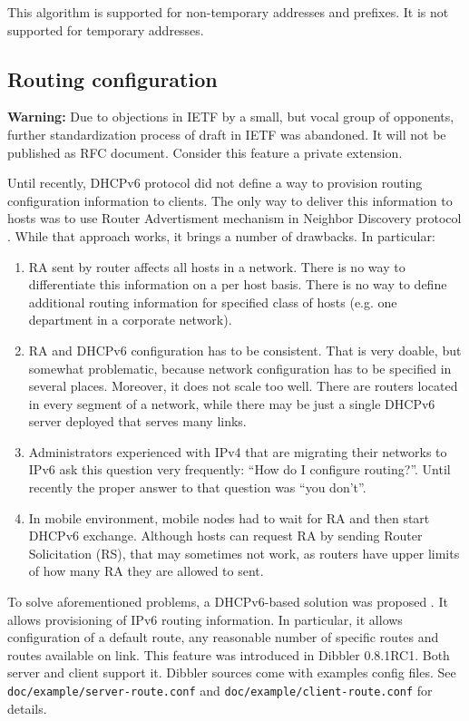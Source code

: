 This algorithm is supported for non-temporary addresses and
prefixes. It is not supported for temporary addresses.

\subsection{Routing configuration}
\label{feature-routing}

\textbf{Warning:} Due to objections in IETF by a small, but vocal group
of opponents, further standardization process
of \cite{draft-route-option} draft in IETF was abandoned. It will not
be published as RFC document. Consider this feature a private extension.

Until recently, DHCPv6 protocol did not define a way to provision
routing configuration information to clients. The only way to deliver
this information to hosts was to use Router Advertisment mechanism in
Neighbor Discovery protocol \cite{rfc4862}. While that approach works,
it brings a number of drawbacks. In particular:
\begin{enumerate}
\item RA sent by router affects all hosts in a network. There is no
way to differentiate this information on a per host basis. There is no
way to define additional routing information for specified class of
hosts (e.g. one department in a corporate network).
\item RA and DHCPv6 configuration has to be consistent. That is very
doable, but somewhat problematic, because network configuration has to
be specified in several places. Moreover, it does not scale too
well. There are routers located in every segment of a network, while
there may be just a single DHCPv6 server deployed that serves many links.
\item Administrators experienced with IPv4 that are migrating their
networks to IPv6 ask this question very frequently: ``How do I
configure routing?''. Until recently the proper answer to that
question was ``you don't''.
\item In mobile environment, mobile nodes had to wait for RA and then
start DHCPv6 exchange. Although hosts can request RA by sending Router
Solicitation (RS), that may sometimes not work, as routers have upper
limits of how many RA they are allowed to sent.
\end{enumerate}

To solve aforementioned problems, a DHCPv6-based solution was
proposed \cite{draft-route-option}. It allows provisioning of IPv6
routing information. In particular, it allows configuration of a
default route, any reasonable number of specific routes and routes
available on link. This feature was introduced in Dibbler
0.8.1RC1. Both server and client support it. Dibbler sources come with
examples config files. See \verb+doc/example/server-route.conf+
and \verb+doc/example/client-route.conf+ for details.

